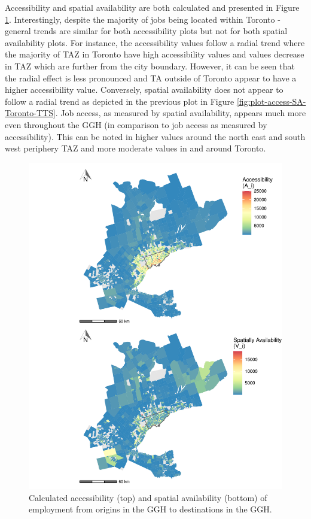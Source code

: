 \documentclass[]{elsarticle} %
\begin{document}
Accessibility and spatial availability are both calculated and presented
in Figure \ref{fig:plot-access-SA-GGH-TTS}. Interestingly, despite the
majority of jobs being located within Toronto - general trends are
similar for both accessibility plots but not for both spatial
availability plots. For instance, the accessibility values follow a
radial trend where the majority of TAZ in Toronto have high
accessibility values and values decrease in TAZ which are further from
the city boundary. However, it can be seen that the radial effect is
less pronounced and TA outside of Toronto appear to have a higher
accessibility value. Conversely, spatial availability does not appear to
follow a radial trend as depicted in the previous plot in Figure
\ref{fig:plot-access-SA-Toronto-TTS}. Job access, as measured by spatial
availability, appears much more even throughout the GGH (in comparison
to job access as measured by accessibility). This can be noted in higher
values around the north east and south west periphery TAZ and more
moderate values in and around Toronto.

\begin{figure}
\includegraphics[width=1\linewidth]{Spatial-Availability_files/figure-latex/plot-access-SA-GGH-TTS-1} \caption{\label{fig:plot-access-SA-GGH-TTS}Calculated accessibility (top) and spatial availability (bottom) of employment from origins in the GGH to destinations in the GGH.}\label{fig:plot-access-SA-GGH-TTS}
\end{figure}
\end{document}
